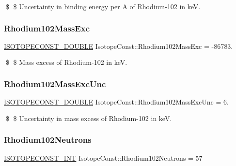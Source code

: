\$ \$ Uncertainty in binding energy per A of Rhodium-\/102 in keV. \mbox{\label{group___isotope_const-_rhodium-_rh102_ga63e8f36a9c13f679e05230ca6e1bffdd}} 
\subsubsection{\texorpdfstring{Rhodium102\+Mass\+Exc}{Rhodium102MassExc}}
{\footnotesize\ttfamily \mbox{\hyperlink{group___isotope_const-_macros_ga8f45a7272ce02c0b4c65c44636ed719a}{I\+S\+O\+T\+O\+P\+E\+C\+O\+N\+S\+T\+\_\+\+D\+O\+U\+B\+LE}} Isotope\+Const\+::\+Rhodium102\+Mass\+Exc = -\/86783.}

\$ \$ Mass excess of Rhodium-\/102 in keV. \mbox{\label{group___isotope_const-_rhodium-_rh102_ga05e366e16b6328994dbfc90de1e93c1f}} 
\subsubsection{\texorpdfstring{Rhodium102\+Mass\+Exc\+Unc}{Rhodium102MassExcUnc}}
{\footnotesize\ttfamily \mbox{\hyperlink{group___isotope_const-_macros_ga8f45a7272ce02c0b4c65c44636ed719a}{I\+S\+O\+T\+O\+P\+E\+C\+O\+N\+S\+T\+\_\+\+D\+O\+U\+B\+LE}} Isotope\+Const\+::\+Rhodium102\+Mass\+Exc\+Unc = 6.}

\$ \$ Uncertainty in mass excess of Rhodium-\/102 in keV. \mbox{\label{group___isotope_const-_rhodium-_rh102_ga0a59b7abea96fc06b208d39e00b137dc}} 
\subsubsection{\texorpdfstring{Rhodium102\+Neutrons}{Rhodium102Neutrons}}
{\footnotesize\ttfamily \mbox{\hyperlink{group___isotope_const-_macros_ga5f18360b3e99483a35c32d789e62621c}{I\+S\+O\+T\+O\+P\+E\+C\+O\+N\+S\+T\+\_\+\+I\+NT}} Isotope\+Const\+::\+Rhodium102\+Neutrons = 57}

